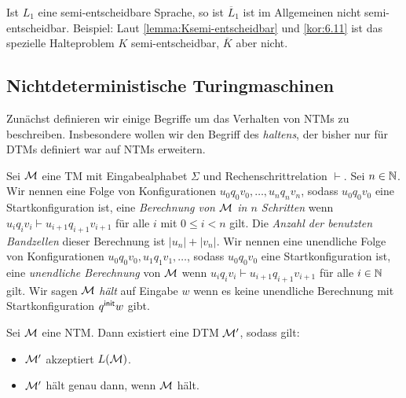 \begin{Bemerkung}
	Ist $L_1$ eine semi-entscheidbare Sprache, so ist $\overline{L}_1$ ist im Allgemeinen nicht semi-entscheidbar.
	Beispiel: Laut \autoref{lemma:Ksemi-entscheidbar} und \autoref{kor:6.11} ist das spezielle Halteproblem $K$ semi-entscheidbar, $\overline{K}$ aber nicht.
\end{Bemerkung}




\subsection{Nichtdeterministische Turingmaschinen}

Zunächst definieren wir einige Begriffe um das Verhalten von \acp{NTM} zu beschreiben.
Insbesondere wollen wir den Begriff des \emph{haltens}, 
der bisher nur für \acp{DTM} definiert war auf \acp{NTM} erweitern.


\begin{Def}[Berechnung]
	Sei $\mathcal{M}$ eine TM mit Eingabealphabet $\Sigma$ und Rechenschrittrelation $\vdash$.
	Sei $n\in\mathbb{N}$. Wir nennen eine Folge von Konfigurationen $u_0q_0v_0, \ldots, u_nq_nv_n$,
	sodass $u_0q_0v_0$ eine Startkonfiguration ist,
	eine \emph{Berechnung von $\mathcal{M}$ in $n$ Schritten} wenn $u_iq_iv_i\vdash u_{i+1}q_{i+1}v_{i+1}$
	für alle $i$ mit $0\leq i < n$ gilt.
	Die \emph{Anzahl der benutzten Bandzellen} dieser Berechnung ist $|u_n|+|v_n|$.
	Wir nennen eine unendliche Folge von Konfigurationen $u_0q_0v_0, u_1q_1v_1,\ldots$,
	sodass $u_0q_0v_0$ eine Startkonfiguration ist,
	eine \emph{unendliche Berechnung} von $\mathcal{M}$ wenn $u_iq_iv_i\vdash u_{i+1}q_{i+1}v_{i+1}$
	für alle $i\in\mathbb{N}$ gilt.
	Wir sagen $\mathcal{M}$ \emph{hält} auf Eingabe $w$ wenn es keine unendliche Berechnung
	mit Startkonfiguration $q^\mathsf{init} w$ gibt.
\end{Def}





\begin{Satz}\label{satz:Ntm2Dtm}
	Sei $\mathcal{M}$ eine \ac{NTM}.
	Dann existiert eine \ac{DTM} $\mathcal{M}'$, sodass gilt:
	\begin{itemize}
	\item $\mathcal{M}'$ akzeptiert $L(\mathcal{M})$.
	\item $\mathcal{M}'$ hält genau dann, wenn $\mathcal{M}$ hält.
	\qedhere
	\end{itemize}
\end{Satz}

